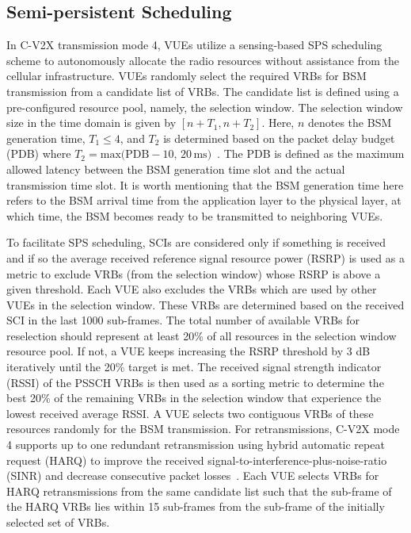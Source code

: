 \documentclass[conference]{IEEEtran}
\begin{document}
\subsection{Semi-persistent Scheduling}\label{sec_sub_sps}
In C-V2X transmission mode 4, VUEs utilize a sensing-based SPS scheduling scheme to autonomously allocate the radio resources without assistance from the cellular infrastructure. VUEs randomly select the required VRBs for BSM transmission from a candidate list of VRBs. The candidate list is defined using a pre-configured resource pool,  namely, the selection window. The selection window size in the time domain is given by $[n+T_{1},n+T_{2}]$. Here, $n$ denotes the BSM generation time, $T_{1}\le{4}$, and $T_{2}$ is determined based on the packet delay budget (PDB) where $T_{2}=\mathrm{max(PDB}-10,\,20\,\mathrm{ms})$~\cite{J3161}. The PDB is defined as the maximum allowed latency between the BSM generation time slot and the actual transmission time slot. It is worth mentioning that the BSM generation time here refers to the BSM arrival time from the application layer to the physical layer, at which time, the BSM becomes ready to be transmitted to neighboring VUEs. 

To facilitate SPS scheduling, SCIs are considered only if something is received and if so the average received reference signal resource power (RSRP) is used as a metric to exclude VRBs (from the selection window) whose RSRP is above a given threshold. Each VUE also excludes the VRBs which are used by other VUEs in the selection window. These VRBs are determined based on the received SCI in the last 1000 sub-frames. The total number of available VRBs for reselection should represent at least 20\% of all resources in the selection window resource pool. If not, a VUE keeps increasing the RSRP threshold by 3 dB iteratively until the 20\% target is met. The received signal strength indicator (RSSI) of the PSSCH VRBs is then used as a sorting metric to determine the best 20\% of the remaining VRBs in the selection window that experience the lowest received average RSSI. A VUE selects two contiguous VRBs of these resources randomly for the BSM transmission. For retransmissions, C-V2X mode 4 supports up to one redundant retransmission using hybrid automatic repeat request (HARQ) to improve the received signal-to-interference-plus-noise-ratio (SINR) and decrease consecutive packet losses~\cite{3gpp36321}. Each VUE selects VRBs for HARQ retransmissions from the same candidate list such that the sub-frame of the HARQ VRBs lies within 15 sub-frames from the sub-frame of the initially selected set of VRBs.
\end{document}
